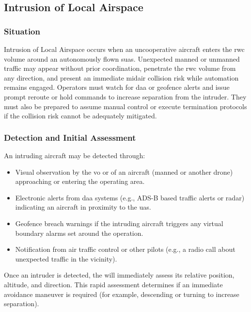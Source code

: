         \subsection{Intrusion of Local Airspace}\label{ssec:ep-intrusion}
        
            \subsubsection{Situation}Intrusion of Local Airspace occurs when an uncooperative aircraft enters the \ac{rwc} volume around an autonomously flown \ac{suas}. Unexpected manned or unmanned traffic may appear without prior coordination, penetrate the \ac{rwc} volume from any direction, and present an immediate midair collision risk while automation remains engaged. Operators must watch for \ac{daa} or geofence alerts and issue prompt reroute or hold commands to increase separation from the intruder. They must also be prepared to assume manual control or execute termination protocols if the collision risk cannot be adequately mitigated.
 
            \subsubsection{Detection and Initial Assessment} An intruding aircraft may be detected through:
            \begin{itemize}
                \item Visual observation by the \ac{vo} or  of an aircraft (manned or another drone) approaching or entering the operating area.
                \item Electronic alerts from \ac{daa} systems (e.g., ADS-B based traffic alerts or radar) indicating an aircraft in proximity to the \ac{uas}.
                \item Geofence breach warnings if the intruding aircraft triggers any virtual boundary alarms set around the operation.
                \item Notification from air traffic control or other pilots (e.g., a radio call about unexpected traffic in the vicinity).
            \end{itemize}
            Once an intruder is detected, the  will immediately assess its relative position, altitude, and direction. This rapid assessment determines if an immediate avoidance maneuver is required (for example, descending or turning to increase separation).
 
